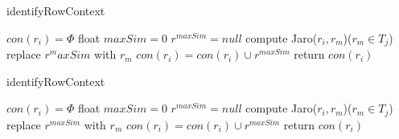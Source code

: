 \documentclass{article}
\begin{document}
\begin{algorithm}
	\caption{identifyRowContext}
	$con(r_i)= \Phi$\;
	{
		float $maxSim=0$\;
		$r^{maxSim}=null$\;
		{
			compute Jaro($r_i,r_m$)($r_m \in T_j$)\;
			{
				replace $r^maxSim$ with $r_m$\;
			}   
		}
		$con(r_i)=con(r_i) \cup {r^{maxSim}}$\;
	}
	return $con(r_i)$\;
\end{algorithm}

\begin{algorithm} [!ht]
	\caption{identifyRowContext} 
	$con(r_i)= \Phi$\; 
	{ 
		float $maxSim=0$\; 
		$r^{maxSim}=null$\; 
		{ 
			compute Jaro($r_i,r_m$)($r_m\in T_j$)\; 
			{ 
				replace $r^{maxSim}$ with $r_m$\; 
			} 
		} 
		$con(r_i)=con(r_i)\cup {r^{maxSim}}$\; 
	} 
	return $con(r_i)$\; 
\end{algorithm}
			
\end{document}
